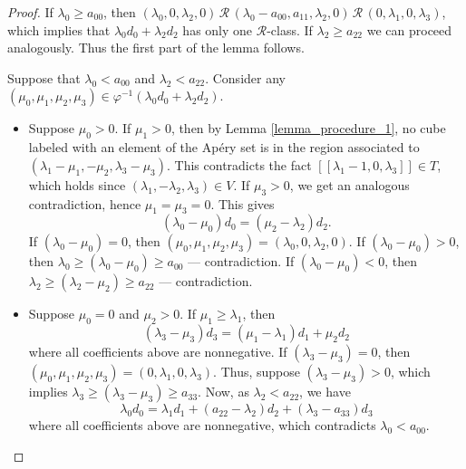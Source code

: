 \documentclass[12pt]{article}
\theoremstyle{remark}
\begin{document}
\begin{proof}
    If $\lambda_0 \geq a_{00}$, then $(\lambda_0,0,\lambda_2,0) \, \mathcal{R} \, (\lambda_0-a_{00},a_{11},\lambda_2,0) \, \mathcal{R} \, (0,\lambda_1,0,\lambda_3)$, which implies that $\lambda_0d_0 + \lambda_2d_2$ has only one $\mathcal{R}$-class. If $\lambda_2 \geq a_{22}$ we can proceed analogously. Thus the first part of the lemma follows.

    Suppose that $\lambda_0 < a_{00}$ and $\lambda_2 < a_{22}$. Consider any $(\mu_0,\mu_1,\mu_2,\mu_3) \in \varphi^{-1}(\lambda_0d_0 + \lambda_2d_2)$.

    \begin{itemize}
        \item Suppose $\mu_0>0$. If $\mu_1 > 0$, then by Lemma \ref{lemma_procedure_1}, no cube labeled with an element of the Ap{\'e}ry set is in the region associated to $(\lambda_1-\mu_1,-\mu_2,\lambda_3-\mu_3)$. This contradicts the fact $[[\lambda_1-1,0, \lambda_3]] \in T$, which holds since $(\lambda_1,-\lambda_2,\lambda_3) \in V$. If $\mu_3 > 0$, we get an analogous contradiction, hence $\mu_1=\mu_3 = 0$. This gives
        \begin{equation}
            (\lambda_0- \mu_0) d_0 =  (\mu_2 - \lambda_2)d_2.
        \end{equation}
        If $(\lambda_0- \mu_0) = 0$, then $(\mu_0,\mu_1,\mu_2,\mu_3) = (\lambda_0,0,\lambda_2,0)$. If $(\lambda_0- \mu_0) > 0$, then $\lambda_0 \geq (\lambda_0- \mu_0) \geq a_{00}$ --- contradiction. If $(\lambda_0- \mu_0) < 0$, then $\lambda_2 \geq (\lambda_2- \mu_2) \geq a_{22}$ --- contradiction.


        \item
    Suppose $\mu_0 = 0$ and $\mu_2 > 0$. If $\mu_1 \geq \lambda_1$, then
    \begin{equation}
         (\lambda_3-\mu_3)d_3 = (\mu_1-\lambda_1)d_1 + \mu_2d_2
    \end{equation}
    where all coefficients above are nonnegative. If $(\lambda_3-\mu_3) = 0$, then $(\mu_0,\mu_1,\mu_2,\mu_3) = (0,\lambda_1,0,\lambda_3)$. Thus, suppose $(\lambda_3-\mu_3) > 0$, which implies $\lambda_3 \geq (\lambda_3-\mu_3) \geq a_{33}$. Now, as $\lambda_2 < a_{22}$, we have
    \begin{equation}\label{lemma_catenary_lambda23_secondary_eq2}
        \lambda_0d_0 = \lambda_1d_1 + (a_{22}-\lambda_2)d_2 + (\lambda_3 - a_{33})d_3
    \end{equation}
    where all coefficients above are nonnegative, which contradicts $\lambda_0 < a_{00}$. 
    

\end{itemize}
\end{proof}
\end{document}
